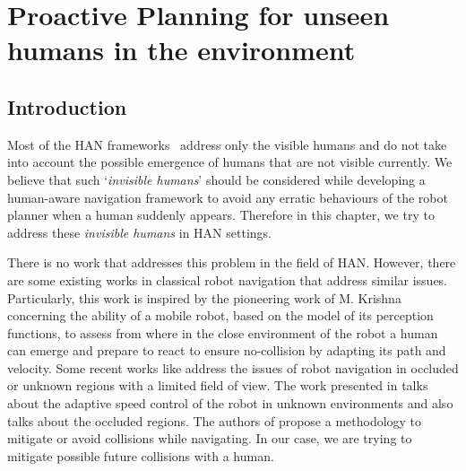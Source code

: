 \ifdefined{}
\else
\setcounter{chapter}{4} 
\dominitoc
\faketableofcontents
\fi

\chapter{Proactive Planning for unseen humans in the environment}
\label{chap:5}
\minitoc
\section{Introduction}
Most of the HAN frameworks~\cite{moller2021survey, kruse_ras_2013} address only the visible humans and do not take into account the possible emergence of humans that are not visible currently. We believe that such `\textit{invisible humans}' should be considered while developing a human-aware navigation framework to avoid any erratic behaviours of the robot planner when a human suddenly appears. Therefore in this chapter, we try to address these \textit{invisible humans} in HAN settings.

There is no work that addresses this problem in the field of HAN. However, there are some existing works in classical robot navigation that address similar issues. Particularly, this work is inspired by the pioneering work of M. Krishna~ \cite{madhavakrishna-ra-2006, alami-springer-2007, madhavakrishna-iros-2003} concerning the ability of a mobile robot, based on the model of its perception functions, to assess from where in the close environment of the robot a human can emerge and prepare to react to ensure no-collision by adapting its path and velocity. Some recent works like \cite{chung2009safe, Bouraine-2012} address the issues of robot navigation in occluded or unknown regions with a limited field of view. The work presented in \cite{miura2006adaptive} talks about the adaptive speed control of the robot in unknown environments and also talks about the occluded regions. The authors of \cite{lambert2008collision} propose a methodology to mitigate or avoid collisions while navigating. In our case, we are trying to mitigate possible future collisions with a human. 

